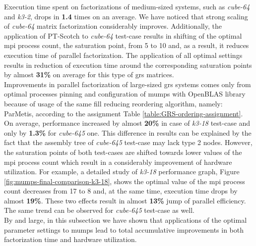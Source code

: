 Execution time spent on factorizations of medium-sized systems, such as \textit{cube-64} and \textit{k3-2}, drops in \textbf{1.4} times on an average. We have noticed that strong scaling of \textit{cube-64} matrix factorization considerably improves. Additionally, the application of PT-Scotch to \textit{cube-64} test-case results in shifting of the optimal \acrshort{mpi} process count, the saturation point, from 5 to 10 and, as a result, it reduces execution time of parallel factorization. The application of all optimal settings results in reduction of execution time around the corresponding saturation points by almost \textbf{31\%} on average for this type of \acrshort{grs} matrices.\\



Improvements in parallel factorization of large-sized \acrshort{grs} systems comes only from optimal processes pinning and configuration of \acrshort{mumps} with OpenBLAS library because of usage of the same fill reducing reordering algorithm, namely: ParMetis, according to the assignment Table \ref{table:GRS-ordering-assignment}. On average, performance increased by almost \textbf{20\%} in case of \textit{k3-18} test-case and only by \textbf{1.3\%} for \textit{cube-645} one. This difference in results can be explained by the fact that the assembly tree of \textit{cube-645} test-case may lack type 2 nodes. However, the saturation points of both test-cases are shifted towards lower values of  the \acrshort{mpi} process count which result in a considerably improvement of hardware utilization. For example, a detailed study of \textit{k3-18} performance graph, Figure \ref{fig:mumps-final-comparison-k3-18}, shows the optimal value of the \acrshort{mpi} process count  decreases from 17 to 8 and, at the same time, execution time drops by almost \textbf{19\%}. These two effects result in almost \textbf{13\%} jump of parallel efficiency. The same trend can be observed for \textit{cube-645} test-case as well.\\


By and large, in this subsection we have shown that applications of the optimal parameter settings to \acrshort{mumps} lead to total accumulative improvements in both factorization time and hardware utilization.\\



